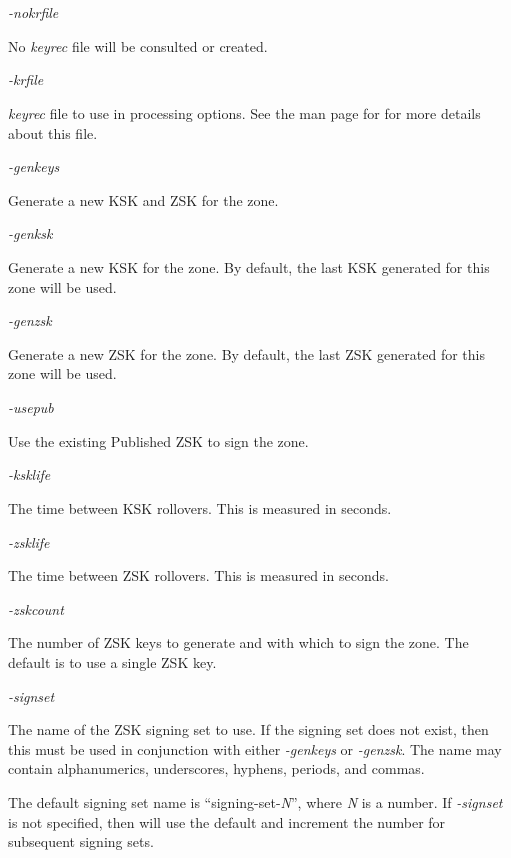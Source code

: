 \begin{description}

\item {\it -nokrfile}\verb" "

No {\it keyrec} file will be consulted or created.

\item {\it -krfile}\verb" "

{\it keyrec} file to use in processing options.  See the man page for
 for more details about this file.

\item {\it -genkeys}\verb" "

Generate a new KSK and ZSK for the zone.

\item {\it -genksk}\verb" "

Generate a new KSK for the zone.  By default, the last KSK generated for this
zone will be used.

\item {\it -genzsk}\verb" "

Generate a new ZSK for the zone.  By default, the last ZSK generated for this
zone will be used.

\item {\it -usepub}\verb" "

Use the existing Published ZSK to sign the zone.

\item {\it -ksklife}\verb" "

The time between KSK rollovers.  This is measured in seconds.

\item {\it -zsklife}\verb" "

The time between ZSK rollovers.  This is measured in seconds.

\item {\it -zskcount}\verb" "

The number of ZSK keys to generate and with which to sign the zone.  The
default is to use a single ZSK key.

\item {\it -signset}\verb" "

The name of the ZSK signing set to use.  If the signing set does not exist,
then this must be used in conjunction with either {\it -genkeys} or {\it
-genzsk}.  The name may contain alphanumerics, underscores, hyphens, periods,
and commas.

The default signing set name is ``signing-set-{\it N}'', where {\it N} is a
number.  If {\it -signset} is not specified, then  will use
the default and increment the number for subsequent signing sets.


\end{description}

